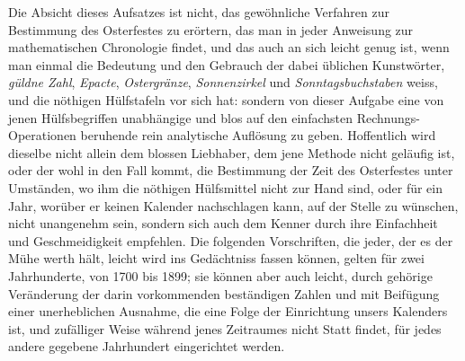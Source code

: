 \begingroup
\pagestyle{empty}
%
\vspace*{.11\textheight}
{}
\bigskip
\noindent{}\par
\bigskip
Die Absicht dieses Aufsatzes ist nicht, das gewöhnliche Verfahren zur Be\-stimmung
des Osterfestes zu erörtern, das man in jeder Anweisung zur mathematischen
Chronologie findet, und das auch an sich leicht genug ist, wenn man
einmal die Bedeutung und den Gebrauch der dabei üblichen Kunstwörter, \textit{güldne
Zahl}, \textit{Epacte}, \textit{Ostergränze}, \textit{Sonnenzirkel} und \textit{Sonntagsbuchstaben} weiss, und die
nöthigen Hülfstafeln vor sich hat: sondern von dieser Aufgabe eine von jenen
Hülfsbegriffen unabhängige und blos auf den einfachsten Rechnungs-Operationen
beruhende rein analytische Auflösung zu geben. Hoffentlich wird dieselbe
nicht allein dem blossen Liebhaber, dem jene Methode nicht geläufig ist, oder
der wohl in den Fall kommt, die Bestimmung der Zeit des Osterfestes unter Umständen,
wo ihm die nöthigen Hülfsmittel nicht zur Hand sind, oder für ein Jahr,
worüber er keinen Kalender nachschlagen kann, auf der Stelle zu wünschen,
nicht unangenehm sein, sondern sich auch dem Kenner durch ihre Einfachheit
und Geschmeidigkeit empfehlen. Die folgenden Vorschriften, die jeder, der es
der Mühe werth hält, leicht wird ins Gedächtniss fassen können, gelten für zwei
Jahrhunderte, von 1700 bis 1899; sie können aber auch leicht, durch gehörige
Veränderung der darin vorkommenden beständigen Zahlen und mit Beifügung
einer unerheblichen Ausnahme, die eine Folge der Einrichtung unsers Kalenders
ist, und zufälliger Weise während jenes Zeitraumes nicht Statt findet, für jedes
andere gegebene Jahrhundert eingerichtet werden.

